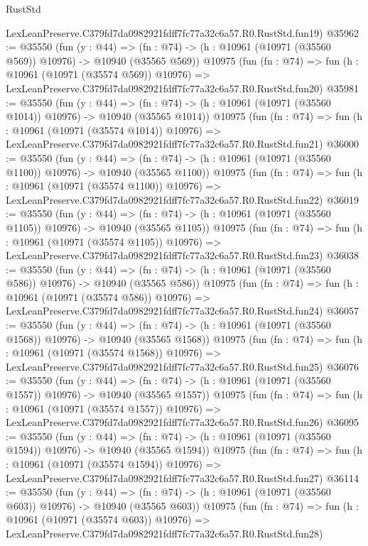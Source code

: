 \begin{lexlean}{RustStd}
\begin{coremodule}
    LexLeanPreserve.C379fd7da0982921fdff7fc77a32c6a57.R0.RustStd.fun19)
@35962 := @35550
    (fun (y : @44) =>
    (fn : @74) -> (h : @10961 (@10971 (@35560 @569)) @10976) -> @10940 (@35565 @569))
    @10975
    (fun (fn : @74) =>
    fun (h : @10961 (@10971 (@35574 @569)) @10976) =>
    LexLeanPreserve.C379fd7da0982921fdff7fc77a32c6a57.R0.RustStd.fun20)
@35981 := @35550
    (fun (y : @44) =>
    (fn : @74) -> (h : @10961 (@10971 (@35560 @1014)) @10976) -> @10940 (@35565 @1014))
    @10975
    (fun (fn : @74) =>
    fun (h : @10961 (@10971 (@35574 @1014)) @10976) =>
    LexLeanPreserve.C379fd7da0982921fdff7fc77a32c6a57.R0.RustStd.fun21)
@36000 := @35550
    (fun (y : @44) =>
    (fn : @74) -> (h : @10961 (@10971 (@35560 @1100)) @10976) -> @10940 (@35565 @1100))
    @10975
    (fun (fn : @74) =>
    fun (h : @10961 (@10971 (@35574 @1100)) @10976) =>
    LexLeanPreserve.C379fd7da0982921fdff7fc77a32c6a57.R0.RustStd.fun22)
@36019 := @35550
    (fun (y : @44) =>
    (fn : @74) -> (h : @10961 (@10971 (@35560 @1105)) @10976) -> @10940 (@35565 @1105))
    @10975
    (fun (fn : @74) =>
    fun (h : @10961 (@10971 (@35574 @1105)) @10976) =>
    LexLeanPreserve.C379fd7da0982921fdff7fc77a32c6a57.R0.RustStd.fun23)
@36038 := @35550
    (fun (y : @44) =>
    (fn : @74) -> (h : @10961 (@10971 (@35560 @586)) @10976) -> @10940 (@35565 @586))
    @10975
    (fun (fn : @74) =>
    fun (h : @10961 (@10971 (@35574 @586)) @10976) =>
    LexLeanPreserve.C379fd7da0982921fdff7fc77a32c6a57.R0.RustStd.fun24)
@36057 := @35550
    (fun (y : @44) =>
    (fn : @74) -> (h : @10961 (@10971 (@35560 @1568)) @10976) -> @10940 (@35565 @1568))
    @10975
    (fun (fn : @74) =>
    fun (h : @10961 (@10971 (@35574 @1568)) @10976) =>
    LexLeanPreserve.C379fd7da0982921fdff7fc77a32c6a57.R0.RustStd.fun25)
@36076 := @35550
    (fun (y : @44) =>
    (fn : @74) -> (h : @10961 (@10971 (@35560 @1557)) @10976) -> @10940 (@35565 @1557))
    @10975
    (fun (fn : @74) =>
    fun (h : @10961 (@10971 (@35574 @1557)) @10976) =>
    LexLeanPreserve.C379fd7da0982921fdff7fc77a32c6a57.R0.RustStd.fun26)
@36095 := @35550
    (fun (y : @44) =>
    (fn : @74) -> (h : @10961 (@10971 (@35560 @1594)) @10976) -> @10940 (@35565 @1594))
    @10975
    (fun (fn : @74) =>
    fun (h : @10961 (@10971 (@35574 @1594)) @10976) =>
    LexLeanPreserve.C379fd7da0982921fdff7fc77a32c6a57.R0.RustStd.fun27)
@36114 := @35550
    (fun (y : @44) =>
    (fn : @74) -> (h : @10961 (@10971 (@35560 @603)) @10976) -> @10940 (@35565 @603))
    @10975
    (fun (fn : @74) =>
    fun (h : @10961 (@10971 (@35574 @603)) @10976) =>
    LexLeanPreserve.C379fd7da0982921fdff7fc77a32c6a57.R0.RustStd.fun28)

\end{coremodule}
\end{lexlean}
